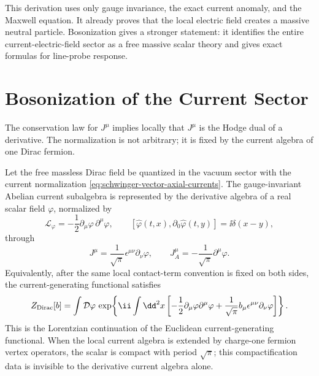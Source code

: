 This derivation uses only gauge invariance, the exact current anomaly, and
the Maxwell equation.  It already proves that the local electric field
creates a massive neutral particle.  Bosonization gives a stronger statement:
it identifies the entire current-electric-field sector as a free massive
scalar theory and gives exact formulas for line-probe response.

\section{Bosonization of the Current Sector}

The conservation law for \(J^\mu\) implies locally that \(J^\mu\) is the
Hodge dual of a derivative.  The normalization is not arbitrary; it is fixed
by the current algebra of one Dirac fermion.

\begin{theorem}
\label{thm:schwinger-current-sector-bosonization}
  Let the free massless Dirac field be quantized in the vacuum sector with
  the current normalization \eqref{eq:schwinger-vector-axial-currents}.  The
  gauge-invariant Abelian current subalgebra is represented by the derivative
  algebra of a real scalar field \(\varphi\), normalized by
  \[
    \mathcal L_\varphi
    =
    -\frac12\partial_\mu\varphi\,\partial^\mu\varphi,
    \qquad
    [\widehat\varphi(t,x),\partial_0\widehat\varphi(t,y)]
    =
    \ii\delta(x-y),
  \]
  through
  \begin{equation}
    J^\mu=\frac1{\sqrt\pi}\epsilon^{\mu\nu}\partial_\nu\varphi,
    \qquad
    J_A^\mu=-\frac1{\sqrt\pi}\partial^\mu\varphi .
    \label{eq:schwinger-bosonization-currents}
  \end{equation}
  Equivalently, after the same local contact-term convention is fixed on
  both sides, the current-generating functional satisfies
  \begin{equation}
    Z_{\rm Dirac}[b]
    =
    \int\mathcal D\varphi\,
    \exp\!\left\{
      \ii\int\dd^2x
      \left[
        -\frac12\partial_\mu\varphi\partial^\mu\varphi
        +\frac1{\sqrt\pi}b_\mu\epsilon^{\mu\nu}\partial_\nu\varphi
      \right]
    \right\}.
    \label{eq:schwinger-current-generating-functional}
  \end{equation}
  This is the Lorentzian continuation of the Euclidean current-generating
  functional.  When the local
  current algebra is extended by charge-one fermion vertex operators, the
  scalar is compact with period \(\sqrt\pi\); this compactification data is
  invisible to the derivative current algebra alone.
\end{theorem}

